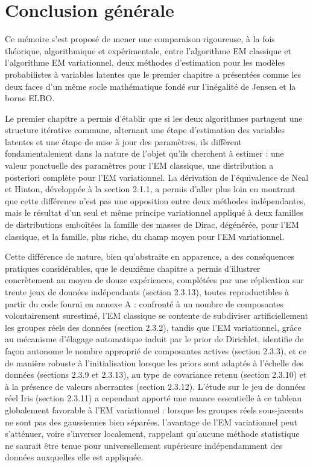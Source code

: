 \chapter*{Conclusion générale}
Ce mémoire s'est proposé de mener une comparaison rigoureuse, à la fois théorique, algorithmique et expérimentale, entre l'algorithme EM classique et l'algorithme EM variationnel, deux méthodes d'estimation pour les modèles probabilistes à variables latentes que le premier chapitre a présentées comme les deux faces d'un même socle mathématique fondé sur l'inégalité de Jensen et la borne ELBO.

Le premier chapitre a permis d'établir que si les deux algorithmes partagent une structure itérative commune, alternant une étape d'estimation des variables latentes et une étape de mise à jour des paramètres, ils diffèrent fondamentalement dans la nature de l'objet qu'ils cherchent à estimer : une valeur ponctuelle des paramètres pour l'EM classique, une distribution a posteriori complète pour l'EM variationnel. La dérivation de l'équivalence de Neal et Hinton, développée à la section 2.1.1, a permis d'aller plus loin en montrant que cette différence n'est pas une opposition entre deux méthodes indépendantes, mais le résultat d'un seul et même principe variationnel appliqué à deux familles de distributions emboîtées  la famille des masses de Dirac, dégénérée, pour l'EM classique, et la famille, plus riche, du champ moyen pour l'EM variationnel.

Cette différence de nature, bien qu'abstraite en apparence, a des conséquences pratiques considérables, que le deuxième chapitre a permis d'illustrer concrètement au moyen de douze expériences, complétées par une réplication sur trente jeux de données indépendants (section 2.3.13), toutes reproductibles à partir du code fourni en annexe A : confronté à un nombre de composantes volontairement surestimé, l'EM classique se contente de subdiviser artificiellement les groupes réels des données (section 2.3.2), tandis que l'EM variationnel, grâce au mécanisme d'élagage automatique induit par le prior de Dirichlet, identifie de façon autonome le nombre approprié de composantes actives (section 2.3.3), et ce de manière robuste à l'initialisation lorsque les priors sont adaptés à l'échelle des données (sections 2.3.9 et 2.3.13), au type de covariance retenu (section 2.3.10) et à la présence de valeurs aberrantes (section 2.3.12). L'étude sur le jeu de données réel Iris (section 2.3.11) a cependant apporté une nuance essentielle à ce tableau globalement favorable à l'EM variationnel : lorsque les groupes réels sous-jacents ne sont pas des gaussiennes bien séparées, l'avantage de l'EM variationnel peut s'atténuer, voire s'inverser localement, rappelant qu'aucune méthode statistique ne saurait être tenue pour universellement supérieure indépendamment des données auxquelles elle est appliquée.

